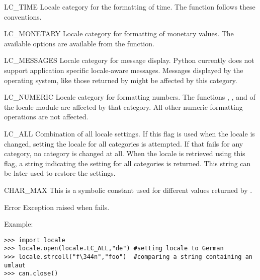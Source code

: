 \begin{datadesc}{LC_TIME}
Locale category for the formatting of time. The function
 follows these conventions.
\end{datadesc}

\begin{datadesc}{LC_MONETARY}
Locale category for formatting of monetary values. The available
options are available from the  function.
\end{datadesc}

\begin{datadesc}{LC_MESSAGES}
Locale category for message display. Python currently does not support
application specific locale-aware messages. Messages displayed by the
operating system, like those returned by  might
be affected by this category.
\end{datadesc}

\begin{datadesc}{LC_NUMERIC}
Locale category for formatting numbers. The functions
, ,  and  of the locale module
are affected by that category. All other numeric formatting operations
are not affected.
\end{datadesc}

\begin{datadesc}{LC_ALL}
Combination of all locale settings. If this flag is used when the
locale is changed, setting the locale for all categories is
attempted. If that fails for any category, no category is changed at
all. When the locale is retrieved using this flag, a string indicating
the setting for all categories is returned. This string can be later
used to restore the settings.
\end{datadesc}

\begin{datadesc}{CHAR_MAX}
This is a symbolic constant used for different values returned by
.
\end{datadesc}

\begin{excdesc}{Error}
Exception raised when  fails.
\end{excdesc}

Example:

\bcode\begin{verbatim}
>>> import locale
>>> locale.open(locale.LC_ALL,"de") #setting locale to German
>>> locale.strcoll("f\344n","foo")  #comparing a string containing an umlaut 
>>> can.close()
\end{verbatim}\ecode
